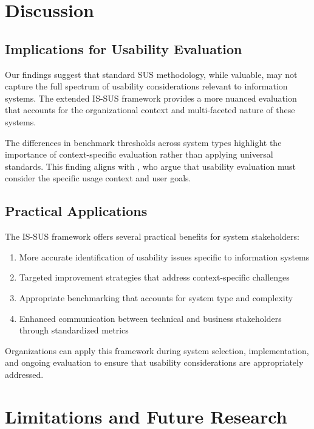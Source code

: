 \documentclass[blindrev]{informs3}
\begin{document}
\section{Discussion}\label{discussion}

\subsection{Implications for Usability Evaluation}\label{evaluation-implications}

Our findings suggest that standard SUS methodology, while valuable, may not capture the full spectrum of usability considerations relevant to information systems. The extended IS-SUS framework provides a more nuanced evaluation that accounts for the organizational context and multi-faceted nature of these systems.

The differences in benchmark thresholds across system types highlight the importance of context-specific evaluation rather than applying universal standards. This finding aligns with \citet{Hornbaek2006}, who argue that usability evaluation must consider the specific usage context and user goals.

\subsection{Practical Applications}\label{practical-applications}

The IS-SUS framework offers several practical benefits for system stakeholders:

\begin{enumerate}
    \item More accurate identification of usability issues specific to information systems
    \item Targeted improvement strategies that address context-specific challenges
    \item Appropriate benchmarking that accounts for system type and complexity
    \item Enhanced communication between technical and business stakeholders through standardized metrics
\end{enumerate}

Organizations can apply this framework during system selection, implementation, and ongoing evaluation to ensure that usability considerations are appropriately addressed.

\section{Limitations and Future Research}\label{limitations}
\end{document}
